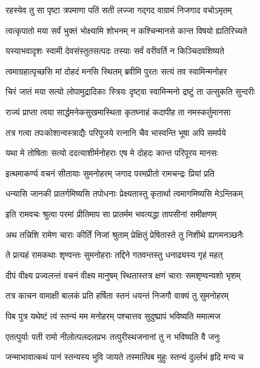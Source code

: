 \twolineshloka
{रहस्येव तु सा पृष्टा त्रपमाणा पतिं सती}
{लज्जा गद्गद वाग्रामं निजगाद वचोऽमृतम्}%


\twolineshloka
{त्वत्कृपातो मया सर्वं भुक्तं भोक्ष्यामि शोभनम्}
{न कश्चिन्मानसे कान्त विषयो ह्यतिरिच्यते}%

\twolineshloka
{यस्याभवादृशः स्वामी देवसंस्तुतसत्पदः}
{तस्याः सर्वं वरीवर्ति न किञ्चिदवशिष्यते}%

\twolineshloka
{त्वमाग्रहात्पृच्छसि मां दोहदं मनसि स्थितम्}
{ब्रवीमि पुरतः सत्यं तव स्वामिन्मनोहर}%

\twolineshloka
{चिरं जातं मया सत्यो लोपामुद्रादिकाः स्त्रियः}
{दृष्ट्वा स्वामिन्मनो द्रष्टुं ता उत्सुकति सुन्दरीः}%

\twolineshloka
{राज्यं प्राप्ता त्वया सार्द्धमनेकसुखमास्थिता}
{कृतघ्नाहं कदापीह ता नमस्कर्तुमानसा}%

\twolineshloka
{तत्र गत्वा तपःकोशान्वस्त्राद्यैः परिपूजये}
{रत्नानि चैव भास्वन्ति भूषा अपि समर्पये}%

\twolineshloka
{यथा मे तोषिताः सत्यो ददत्याशीर्मनोहराः}
{एष मे दोहदः कान्त परिपूरय मानसः}%

\twolineshloka
{इत्थमाकर्ण्य वचनं सीतायाः सुमनोहरम्}
{जगाद परमप्रीतो रामचन्द्रः प्रियां प्रति}%

\twolineshloka
{धन्यासि जानकी प्रातर्गमिष्यसि तपोधनाः}
{प्रेक्ष्यतास्तु कृतार्था त्वमागमिष्यसि मेऽन्तिकम्}%

\twolineshloka
{इति रामवचः श्रुत्वा परमां प्रीतिमाप सा}
{प्रातर्मम भवत्यद्धा तापसीनां समीक्षणम्}%

\twolineshloka
{अथ तन्निशि रामेण चाराः कीर्तिं निजां श्रुताम्}
{प्रेक्षितुं प्रेषितास्ते तु निशीथे ह्यगमनञ्छनैः}%

\twolineshloka
{ते प्रत्यहं रामकथाः शृण्वन्तः सुमनोहराः}
{तद्दिने गतवन्तस्तु धनाढ्यस्य गृहं महत्}%

\twolineshloka
{दीपं वीक्ष्य प्रज्वलन्तं वचनं वीक्ष्य मानुषम्}
{स्थितास्तत्र क्षणं चाराः समशृण्वन्यशो भृशम्}%

\twolineshloka
{तत्र काचन वामाक्षी बालकं प्रति हर्षिता}
{स्तनं धयन्तं निजगौ वाक्यं तु सुमनोहरम्}%

\twolineshloka
{पिब पुत्र यथेष्टं त्वं स्तन्यं मम मनोहरम्}
{पश्चात्तव सुदुष्प्रापं भविष्यति ममात्मज}%

\twolineshloka
{एतत्पुर्याः पती रामो नीलोत्पलदलप्रभः}
{तत्पुरीस्थजनानां तु न भविष्यति वै जनुः}%

\twolineshloka
{जन्माभावात्कथं पानं स्तन्यस्य भुवि जायते}
{तस्मात्पिब मुहुः स्तन्यं दुर्ल्लभं हृदि मन्य च}%

